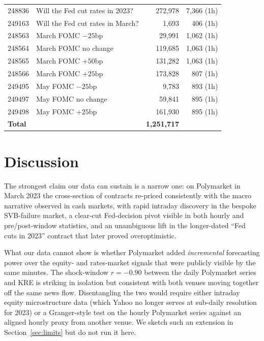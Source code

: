 \documentclass{article}
\begin{document}
\begin{table}[tb]
\begin{tabular}{rlrr}
    248836 & Will the Fed cut rates in 2023?                          &  272{,}978 & 7{,}366 (1h) \\
    249163 & Will the Fed cut rates in March?                         &    1{,}693 &   406 (1h) \\
    248563 & March FOMC $-25$bp                                       &   29{,}991 & 1{,}062 (1h) \\
    248564 & March FOMC no change                                     &  119{,}685 & 1{,}063 (1h) \\
    248565 & March FOMC $+50$bp                                       &  131{,}282 & 1{,}063 (1h) \\
    248566 & March FOMC $+25$bp                                       &  173{,}828 &   807 (1h) \\
    249495 & May FOMC $-25$bp                                         &    9{,}783 &   893 (1h) \\
    249497 & May FOMC no change                                       &   59{,}841 &   895 (1h) \\
    249498 & May FOMC $+25$bp                                         &  161{,}930 &   895 (1h) \\
    \midrule
    \multicolumn{2}{l}{\textbf{Total}} & \textbf{1{,}251{,}717} & \\
    \bottomrule
  \end{tabular}
\end{table}

\section{Discussion}
\label{sec:discussion}

The strongest claim our data can sustain is a narrow one: on Polymarket in
March 2023 the cross-section of contracts re-priced consistently with the
macro narrative observed in cash markets, with rapid intraday discovery
in the bespoke SVB-failure market, a clear-cut Fed-decision pivot
visible in both hourly and pre/post-window statistics, and an
unambiguous lift in the longer-dated ``Fed cuts in 2023'' contract that
later proved overoptimistic.

What our data cannot show is whether Polymarket added \emph{incremental}
forecasting power over the equity- and rates-market signals that were
publicly visible by the same minutes.  The shock-window
$r{=}-0.90$ between the daily Polymarket series and KRE is striking in
isolation but consistent with both venues moving together off the same
news flow.  Disentangling the two would require either intraday equity
microstructure data (which Yahoo no longer serves at sub-daily
resolution for 2023) or a Granger-style test on the hourly Polymarket
series against an aligned hourly proxy from another venue.  We sketch
such an extension in Section~\ref{sec:limits} but do not run it here.
\end{document}
